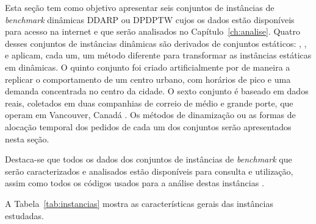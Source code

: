 Esta seção tem como objetivo apresentar seis conjuntos de instâncias de 
\textit{benchmark} dinâmicas DDARP ou DPDPTW cujos os dados estão disponíveis 
para acesso na internet \cite{pankratz_benchmark_2009} e que
serão analisados no Capítulo~\ref{ch:analise}.
Quatro desses conjuntos de instâncias dinâmicas são derivados de conjuntos 
estáticos: 
\textcite{berbeglia_hybrid_tabu_2012},
\textcite{pureza_laporte_waiting_2008}, 
\textcite{pankratz_dynamic_2005}
e \textcite{fabri_dynamic_2006}
aplicam, cada um, um método diferente para transformar as
instâncias estáticas em dinâmicas.
O quinto conjunto foi criado artificialmente por 
\textcite{gendreau_neighborhood_2006} de maneira a replicar o comportamento de 
um centro urbano, com horários de pico e uma demanda concentrada no centro da 
cidade.
O sexto conjunto é baseado em dados reais, coletados em duas companhias 
de correio de médio e grande porte, que operam em Vancouver, Canadá 
\cite{mitrovic-minic_waiting_2004}.
Os métodos de dinamização ou as formas de alocação temporal dos pedidos de cada
um dos conjuntos serão apresentados nesta seção.

Destaca-se que todos os dados dos conjuntos de instâncias de \textit{benchmark}
que serão caracterizados e analisados estão disponíveis para consulta e
utilização, assim como todos os códigos usados para a análise destas
instâncias \cite{eccel_problemas_2019}.

A Tabela~\ref{tab:instancias} mostra as características gerais das instâncias
estudadas.

